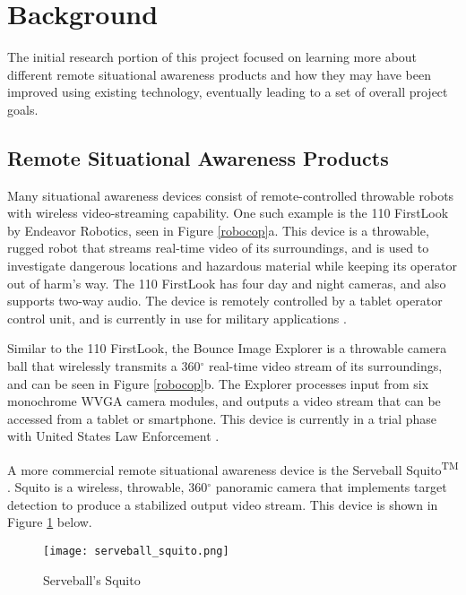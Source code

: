 \section{Background}
The initial research portion of this project focused on learning more about different remote situational awareness products and how they may have been improved using existing technology, eventually leading to a set of overall project goals.

\subsection{Remote Situational Awareness Products}
Many situational awareness devices consist of remote-controlled throwable robots with wireless video-streaming capability. One such example is the 110 FirstLook by Endeavor Robotics, seen in Figure \ref{robocop}a. This device is a throwable, rugged robot that streams real-time video of its surroundings, and is used to investigate dangerous locations and hazardous material while keeping its operator out of harm's way. The 110 FirstLook has four day and night cameras, and also supports two-way audio. The device is remotely controlled by a tablet operator control unit, and is currently in use for military applications \cite{endeavor}.
\par
Similar to the 110 FirstLook, the Bounce Image Explorer is a throwable camera ball that wirelessly transmits a 360$^\circ$ real-time video stream of its surroundings, and can be seen in Figure \ref{robocop}b. The Explorer processes input from six monochrome WVGA camera modules, and outputs a video stream that can be accessed from a tablet or smartphone. This device is currently in a trial phase with United States Law Enforcement \cite{bounceImaging}. 
\par
A more commercial remote situational awareness device is the Serveball Squito\textsuperscript{TM} \cite{serveball}. Squito is a wireless, throwable, 360$^{\circ}$ panoramic camera that implements target detection to produce a stabilized output video stream. This device is shown in Figure \ref{squito} below.

\begin{figure}[H]
	\centerline{\texttt{[image: serveball\_squito.png]}}
	\caption{Serveball's Squito \cite{serveball}}
	\label{squito}
\end{figure}

